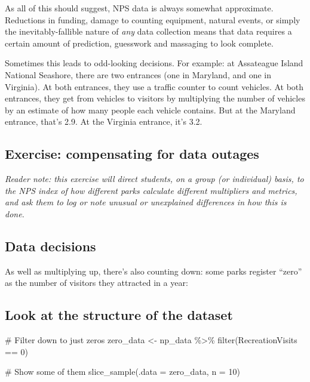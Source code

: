\documentclass[
  letterpaper,
  DIV=11,
  numbers=noendperiod]{scrartcl}
\newenvironment{Shaded}{\begin{snugshade}}{\end{snugshade}}
\newcommand{\AttributeTok}[1]{\textcolor[rgb]{0.40,0.45,0.13}{#1}}
\newcommand{\CommentTok}[1]{\textcolor[rgb]{0.37,0.37,0.37}{#1}}
\newcommand{\DecValTok}[1]{\textcolor[rgb]{0.68,0.00,0.00}{#1}}
\newcommand{\FunctionTok}[1]{\textcolor[rgb]{0.28,0.35,0.67}{#1}}
\newcommand{\NormalTok}[1]{\textcolor[rgb]{0.00,0.23,0.31}{#1}}
\newcommand{\OtherTok}[1]{\textcolor[rgb]{0.00,0.23,0.31}{#1}}
\newcommand{\SpecialCharTok}[1]{\textcolor[rgb]{0.37,0.37,0.37}{#1}}
\begin{document}
As all of this should suggest, NPS data is always somewhat approximate.
Reductions in funding, damage to counting equipment, natural events, or
simply the inevitably-fallible nature of \emph{any} data collection
means that data requires a certain amount of prediction, guesswork and
massaging to look complete.

Sometimes this leads to odd-looking decisions. For example: at
Assateague Island National Seashore, there are two entrances (one in
Maryland, and one in Virginia). At both entrances, they use a traffic
counter to count vehicles. At both entrances, they get from vehicles to
visitors by multiplying the number of vehicles by an estimate of how
many people each vehicle contains. But at the Maryland entrance, that's
2.9. At the Virginia entrance, it's 3.2.

\subsection{Exercise: compensating for data
outages}\label{exercise-compensating-for-data-outages}

\emph{Reader note: this exercise will direct students, on a group (or
individual) basis, to the NPS index of how different parks calculate
different multipliers and metrics, and ask them to log or note unusual
or unexplained differences in how this is done.}

\subsection{Data decisions}\label{data-decisions}

As well as multiplying up, there's also counting down: some parks
register ``zero'' as the number of visitors they attracted in a year:

\subsection{Look at the structure of the
dataset}\label{look-at-the-structure-of-the-dataset}

\begin{Shaded}
\begin{Highlighting}[]
\CommentTok{\# Filter down to just zeros}
\NormalTok{zero\_data }\OtherTok{\textless{}{-}}\NormalTok{ np\_data }\SpecialCharTok{\%\textgreater{}\%} \FunctionTok{filter}\NormalTok{(RecreationVisits }\SpecialCharTok{==} \DecValTok{0}\NormalTok{)}

\CommentTok{\# Show some of them}
\FunctionTok{slice\_sample}\NormalTok{(}\AttributeTok{.data =}\NormalTok{ zero\_data, }\AttributeTok{n =} \DecValTok{10}\NormalTok{)}
\end{Highlighting}
\end{Shaded}
\end{document}
